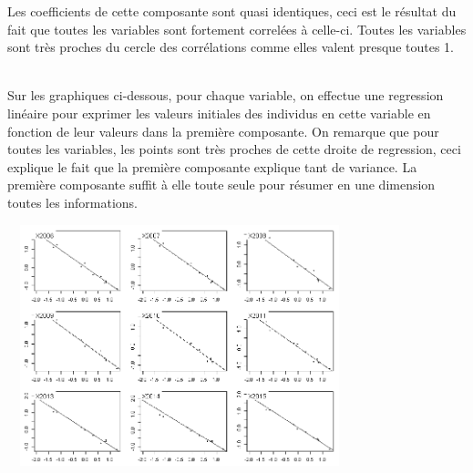 \documentclass{article}
\begin{document}
Les coefficients de cette composante sont quasi identiques, ceci est le résultat du fait que toutes les variables sont fortement correlées à celle-ci. Toutes les variables sont très proches du cercle des corrélations comme elles valent presque toutes 1.

\\Sur les graphiques ci-dessous, pour chaque variable, on effectue une regression linéaire pour exprimer les valeurs initiales des individus en cette variable en fonction de leur valeurs dans la première composante. On remarque que pour toutes les variables, les points sont très proches de cette droite de regression, ceci explique le fait que la première composante explique tant de variance. La première composante suffit à elle toute seule pour résumer en une dimension toutes les informations.

	\includegraphics[width=10cm,height=7cm]{"score"} 
	
\end{document}
